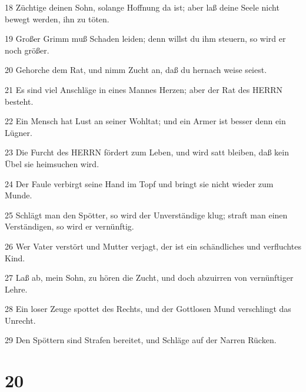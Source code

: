 \par 18 Züchtige deinen Sohn, solange Hoffnung da ist; aber laß deine Seele nicht bewegt werden, ihn zu töten.
\par 19 Großer Grimm muß Schaden leiden; denn willst du ihm steuern, so wird er noch größer.
\par 20 Gehorche dem Rat, und nimm Zucht an, daß du hernach weise seiest.
\par 21 Es sind viel Anschläge in eines Mannes Herzen; aber der Rat des HERRN besteht.
\par 22 Ein Mensch hat Lust an seiner Wohltat; und ein Armer ist besser denn ein Lügner.
\par 23 Die Furcht des HERRN fördert zum Leben, und wird satt bleiben, daß kein Übel sie heimsuchen wird.
\par 24 Der Faule verbirgt seine Hand im Topf und bringt sie nicht wieder zum Munde.
\par 25 Schlägt man den Spötter, so wird der Unverständige klug; straft man einen Verständigen, so wird er vernünftig.
\par 26 Wer Vater verstört und Mutter verjagt, der ist ein schändliches und verfluchtes Kind.
\par 27 Laß ab, mein Sohn, zu hören die Zucht, und doch abzuirren von vernünftiger Lehre.
\par 28 Ein loser Zeuge spottet des Rechts, und der Gottlosen Mund verschlingt das Unrecht.
\par 29 Den Spöttern sind Strafen bereitet, und Schläge auf der Narren Rücken.

\chapter{20}

